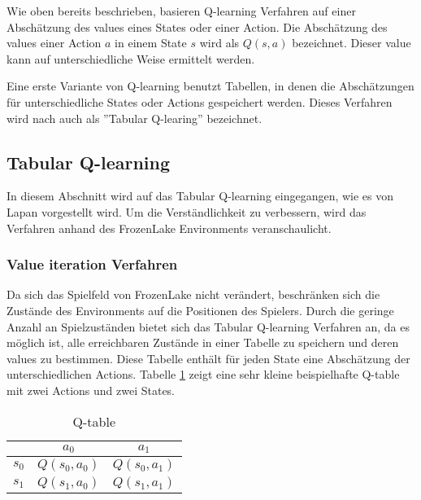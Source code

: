 \documentclass[11pt]{scrartcl}
\begin{document}
Wie oben bereits beschrieben, basieren Q-learning Verfahren auf einer Abschätzung des
values eines States oder einer Action. Die Abschätzung des values einer Action $a$ in
einem State $s$ wird als $Q(s, a)$ bezeichnet. Dieser value kann auf unterschiedliche
Weise ermittelt werden.

Eine erste Variante von Q-learning benutzt Tabellen, in denen die Abschätzungen
für unterschiedliche States oder Actions gespeichert werden. Dieses Verfahren wird nach
\cite[~S.193]{L2018} auch als ''Tabular Q-learing'' bezeichnet.


\subsection{Tabular Q-learning}
\label{sec:tab-q-learning}
In diesem Abschnitt wird auf das Tabular Q-learning eingegangen, wie es von Lapan
\cite[~S.193]{L2018} vorgestellt wird. Um die Ver\-ständ\-lich\-keit zu verbessern,
wird das Verfahren anhand des FrozenLake Environments veranschaulicht.


\subsubsection{Value iteration Verfahren}
Da sich das Spielfeld von FrozenLake nicht verändert, beschränken sich die Zustände des
Environments auf die Positionen des Spielers. Durch die geringe Anzahl an Spielzuständen
bietet sich das Tabular Q-learning Verfahren an, da es möglich ist, alle erreichbaren
Zustände in einer Tabelle zu speichern und deren values zu bestimmen. Diese Tabelle
enthält für jeden State eine Abschätzung der unterschiedlichen Actions.
Tabelle \ref{tab:q_table} zeigt eine sehr kleine beispielhafte Q-table mit zwei Actions
und zwei States.

\begin{table}[ht]
  \begin{center}
    \begin{tabular}{c | c | c}
       & $a_0$ & $a_1$ \\
      \hline
      $s_0$ & $Q(s_0, a_0)$ &$ Q(s_0, a_1)$ \\
      \hline
      $s_1$ & $Q(s_1, a_0)$ & $Q(s_1, a_1)$ \\
    \end{tabular}

    \caption[Q-table]{Q-table}
    \label{tab:q_table}
  \end{center}
\end{table}
\end{document}
